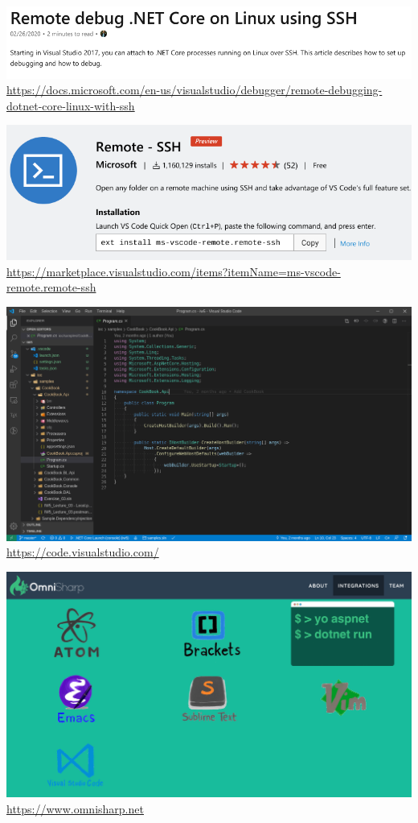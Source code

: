 \documentclass[utf8x]{beamer}
\begin{document}
\begin{frame}
    \centering
    \includegraphics[width=\textwidth]{vs.png}
    \tiny\url{https://docs.microsoft.com/en-us/visualstudio/debugger/remote-debugging-dotnet-core-linux-with-ssh}
\end{frame}

\begin{frame}
    \centering
    \includegraphics[width=\textwidth]{code-ssh.png}
    \tiny\url{https://marketplace.visualstudio.com/items?itemName=ms-vscode-remote.remote-ssh}
\end{frame}

\begin{frame}
    \centering
    \includegraphics[width=\textwidth]{vscode.png}
    \tiny\url{https://code.visualstudio.com/}
\end{frame}

\begin{frame}
    \centering
    \includegraphics[width=\textwidth]{omnisharp.png}
    \tiny\url{https://www.omnisharp.net}
\end{frame}
\end{document}
